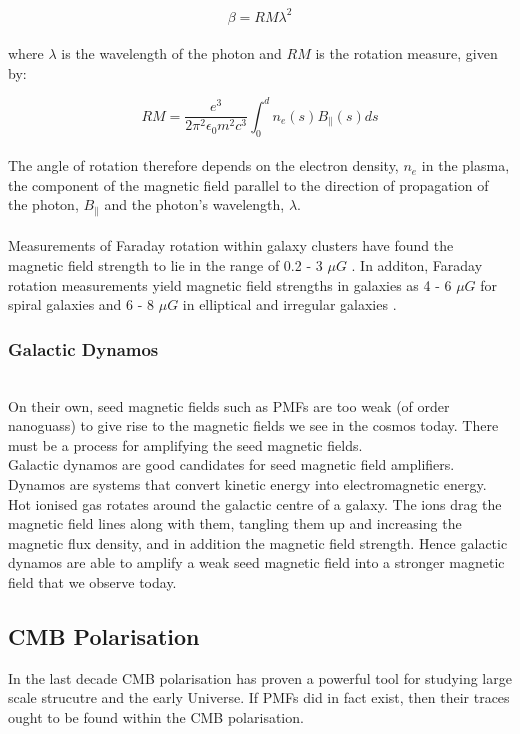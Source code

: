 \begin{equation}
\beta = RM\lambda^2
\end{equation}
\\
where $\lambda$ is the wavelength of the photon and $RM$ is the rotation measure, given by:

\begin{equation}
RM = \frac{e^3}{2\pi ^2 \epsilon_0 m^2 c^3}\int_{0}^{d} n_e(s) B_{\|}(s) ds
\end{equation}
\\
The angle of rotation therefore depends on the electron density, $n_e$ in the plasma, the component of the magnetic field parallel to the direction of propagation of the photon, $B_{\|}$ and the photon's wavelength, $\lambda$.
\\\\
Measurements of Faraday rotation within galaxy clusters have found the magnetic field strength to lie in the range of 0.2 - 3 $\mu G$ \cite{Widrow:2002ud}. In additon, Faraday rotation measurements yield magnetic field strengths in galaxies as 4 - 6 $\mu G$ for spiral galaxies and 6 - 8 $\mu G$ in elliptical and irregular galaxies \cite{Widrow:2002ud}.

\subsubsection*{Galactic Dynamos}
\\
On their own, seed magnetic fields such as PMFs are too weak (of order nanoguass) to give rise to the magnetic fields we see in the cosmos today. There must be a process for amplifying the seed magnetic fields. \\Galactic dynamos are good candidates for seed magnetic field amplifiers. Dynamos are systems that convert kinetic energy into electromagnetic energy. Hot ionised gas rotates around the galactic centre of a galaxy. The ions drag the magnetic field lines along with them, tangling them up and increasing the magnetic flux density, and in addition the magnetic field strength. Hence galactic dynamos are able to amplify a weak seed magnetic field into a stronger magnetic field that we observe today.

\subsection{CMB Polarisation}
In the last decade CMB polarisation has proven a powerful tool for studying large scale strucutre and the early Universe. If PMFs did in fact exist, then their traces ought to be found within the CMB polarisation.

